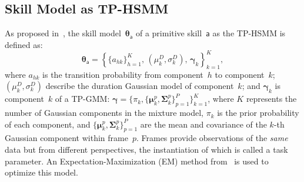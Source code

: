 \subsection{Skill Model as TP-HSMM}\label{subsec:tp-hsmm}
As proposed in~\cite{calinon2016tutorial, Schwenkel2019Optimizing,rozo2020learning}, 
the skill model~$\boldsymbol{\theta}_{\mathsf{a}}$ of a primitive skill~$\mathsf{a}$ as the TP-HSMM is defined as:
\begin{equation}\label{eq:tp-hsmm}
\boldsymbol{\theta}_{\mathsf{a}} = \left\{ \{a_{hk}\}_{h=1}^K,\, (\mu_k^D, \sigma_k^D),\, \boldsymbol{\gamma}_k \right\}_{k=1}^K,
\end{equation}
where $a_{hk}$ is the transition probability from component~$h$ to component~$k$; 
$(\mu_k^D, \sigma_k^D)$ describe the duration Gaussian model of component~$k$; 
and $\boldsymbol{\gamma}_k$ is component~$k$ of a TP-GMM:
$\boldsymbol{\gamma} = \{\pi_k,\{\boldsymbol{\mu}_k^{p},\boldsymbol{\Sigma}_k^{p}\}_{p=1}^P\}_{k=1}^K$,
where $K$ represents the number of Gaussian components in the mixture model, 
$\pi_k$ is the prior probability of each component, 
and $\{\boldsymbol{\mu}_k^{p},\boldsymbol{\Sigma}_k^{p}\}_{p=1}^P$ are the mean and covariance of the $k$-th Gaussian component within frame~$p$. 
Frames provide observations of the \emph{same} data but from different perspectives, the instantiation of which is called a {task parameter}.
An Expectation-Maximization (EM) method from~\cite{dempster77em} is used to optimize this model.
